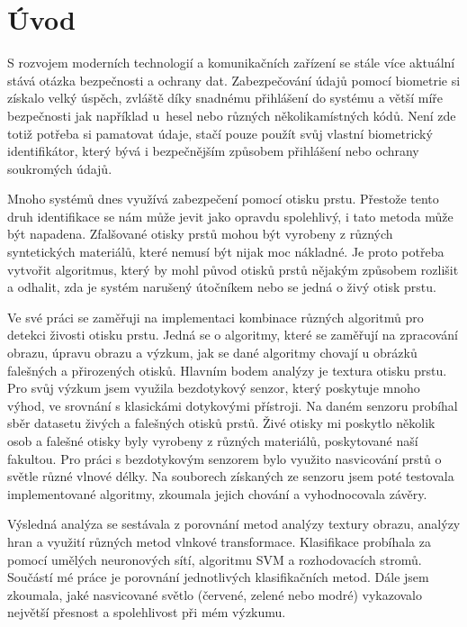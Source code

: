 \chapter{Úvod}
S rozvojem moderních technologií a komunikačních zařízení se stále více aktuální stává otázka bezpečnosti a ochrany dat. Zabezpečování údajů pomocí biometrie si získalo velký úspěch, zvláště díky snadnému přihlášení do systému a větší míře bezpečnosti jak například u~hesel nebo různých několikamístných kódů. Není zde totiž potřeba si pamatovat údaje, stačí pouze použít svůj vlastní biometrický identifikátor, který bývá i bezpečnějším způsobem přihlášení nebo ochrany soukromých údajů. 

Mnoho systémů dnes využívá zabezpečení pomocí otisku prstu. Přestože tento druh identifikace se nám může jevit jako opravdu spolehlivý, i tato metoda může být napadena. Zfalšované otisky prstů mohou být vyrobeny z různých syntetických materiálů, které nemusí být nijak moc nákladné. Je proto potřeba vytvořit algoritmus, který by mohl původ otisků prstů nějakým způsobem rozlišit a odhalit, zda je systém narušený útočníkem nebo se jedná o živý otisk prstu.

Ve své práci se zaměřuji na implementaci kombinace různých algoritmů pro detekci živosti otisku prstu. Jedná se o algoritmy, které se zaměřují na zpracování obrazu, úpravu obrazu a výzkum, jak se dané algoritmy chovají u obrázků falešných a přirozených otisků. Hlavním bodem analýzy je textura otisku prstu. Pro svůj výzkum jsem využila bezdotykový senzor, který poskytuje mnoho výhod, ve srovnání s klasickámi dotykovými přístroji. Na daném senzoru probíhal sběr datasetu živých a falešných otisků prstů. Živé otisky mi poskytlo několik osob a falešné otisky byly vyrobeny z různých materiálů, poskytované naší fakultou. Pro práci s bezdotykovým senzorem bylo využito nasvicování prstů o světle různé vlnové délky. Na souborech získaných ze senzoru jsem poté testovala implementované algoritmy, zkoumala jejich chování a vyhodnocovala závěry.

Výsledná analýza se sestávala z porovnání metod analýzy textury obrazu, analýzy hran a využití různých metod vlnkové transformace. Klasifikace probíhala za pomocí umělých neuronových sítí, algoritmu SVM a rozhodovacích stromů. Součástí mé práce je porovnání jednotlivých klasifikačních metod. Dále jsem zkoumala, jaké nasvicované světlo (červené, zelené nebo modré) vykazovalo největší přesnost a spolehlivost při mém výzkumu. 






